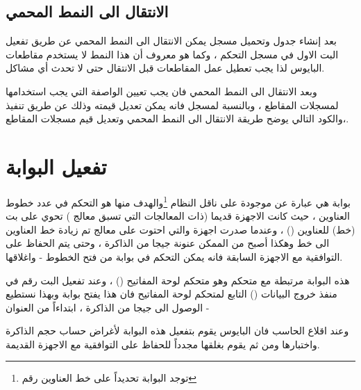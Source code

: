 \documentclass[document.tex]{subfiles}
\begin{document}
 
\subsection{الانتقال الى النمط المحمي}
بعد إنشاء جدول  وتحميل مسجل  يمكن الانتقال الى النمط المحمي عن طريق تفعيل البت الاول في مسجل التحكم ، وكما هو معروف أن هذا النمط لا يستخدم مقاطعات البايوس لذا يجب تعطيل عمل المقاطعات قبل الانتقال حتى لا تحدث أي مشاكل.

وبعد الانتقال الى النمط المحمي فان يجب تعيين الواصفة التي يجب استخدامها لمسجلات المقاطع ، وبالنسبة لمسجل  فانه يمكن تعديل قيمته وذلك عن طريق تنفيذ  ،والكود التالي يوضح طريقة الانتقال الى النمط المحمي وتعديل قيم مسجلات المقاطع.

 
\begin{english}
\lstset{numberstyle=\tiny,numbers=left,stepnumber=1,numbersep=5pt,tabsize=2,extendedchars=true,breaklines=true,frame=b,showspaces=false, showtabs=false,xleftmargin=10pt,framexleftmargin=10pt,framexrightmargin=5pt,framexbottommargin=4pt,showstringspaces=false,language=[x86masm]Assembler}


\end{english}


\section{تفعيل البوابة }
بوابة  هي عبارة عن  موجودة على ناقل النظام  \footnote{توجد البوابة تحديداً على خط العناوين رقم }والهدف منها هو التحكم في عدد خطوط العناوين ، حيث كانت الاجهزة قديما (ذات المعالجات التي تسبق معالج ) تحوي على  بت (خط) للعناوين () ، وعندما صدرت اجهزة  والتي احتوت على معالج  تم زيادة خط العناوين الى  خط وهكذا أصبح من الممكن عنونة  جيجا من الذاكرة ، وحتى يتم الحفاظ على التوافقية مع الاجهزة السابقة فانه يمكن التحكم في بوابة  من فتح الخطوط - واغلاقها.

هذه البوابة مرتبطة مع متحكم  وهو متحكم لوحة المفاتيح () ، وعند تفعيل البت رقم  في منفذ خروج البيانات () التابع لمتحكم لوحة المفاتيح فان هذا يفتح بوابة  وبهذا نستطيع الوصول الى  جيجا من الذاكرة ، ابتداءاً من العنوان - 

وعند اقلاع الحاسب فان البايوس يقوم بتفعيل هذه البوابة لأغراض حساب حجم الذاكرة واختبارها ومن ثم يقوم بغلقها مجدداً للحفاظ على التوافقية مع الاجهزة القديمة.
\end{document}
